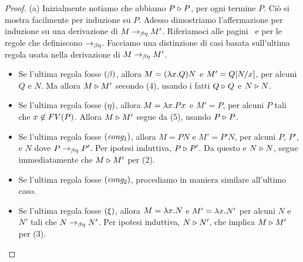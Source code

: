 \documentclass{article}
\begin{document}
\begin{proof}
  (a) Inizialmente notiamo che abbiamo $P\mathrel{\triangleright} P$, per ogni termine $P$. Ci\`o si mostra
  facilmente per induzione su $P$. Adesso dimostriamo l'affermazione
  per induzione su una derivazione di $M\rightarrow_{\beta\eta} M'$.  Riferiamoci alle
  pagini~\pageref{page-def-beta} e {\pageref{page-def-eta}} per
  le regole che definiscono $\rightarrow_{\beta\eta}$. Facciamo una distinzione di casi
  basata sull'ultima regola usata nella derivazione di $M\rightarrow_{\beta\eta} M'$.
  \begin{itemize}
  \item Se l'ultima regola fosse $\textrm{(\textit{$\beta$\/})}$, allora $M=(\lambda x.Q)N$ e
    $M'=Q[N/x]$, per alcuni $Q$ e $N$. Ma allora $M\mathrel{\triangleright} M'$ secondo 
    (4), usando i fatti $Q\mathrel{\triangleright} Q$ e $N\mathrel{\triangleright} N$. 
  \item Se l'ultima regola fosse $\textrm{(\textit{$\eta$\/})}$, allora $M=\lambda x.Px$ e
    $M'=P$, per alcuni $P$ tali che $x\not\in FV(P)$. Allora $M\mathrel{\triangleright} M'$
    segue da (5), usando $P\mathrel{\triangleright} P$.
  \item Se l'ultima regola fosse $\textrm{(\textit{cong$_1$\/})}$, allora $M=PN$ e
    $M'=P'N$, per alcuni $P$, $P'$, e $N$ dove $P\rightarrow_{\beta\eta} P'$. Per
    ipotesi induttiva, $P\mathrel{\triangleright} P'$. Da questo e $N\mathrel{\triangleright} N$, segue
    immediatamente che $M\mathrel{\triangleright} M'$ per (2).
  \item Se l'ultima regola fosse $\textrm{(\textit{cong$_2$\/})}$, procediamo
    in maniera similare all'ultimo caso.
  \item Se l'ultima regola fosse $\textrm{(\textit{$\xi$\/})}$, allora $M=\lambda x.N$ e
    $M'=\lambda x.N'$ per alcuni $N$ e $N'$ tali che $N\rightarrow_{\beta\eta} N'$. Per
    ipotesi induttiva, $N\mathrel{\triangleright} N'$, che implica $M\mathrel{\triangleright} M'$ per (3).
  \end{itemize}
  

\end{proof}
\end{document}
